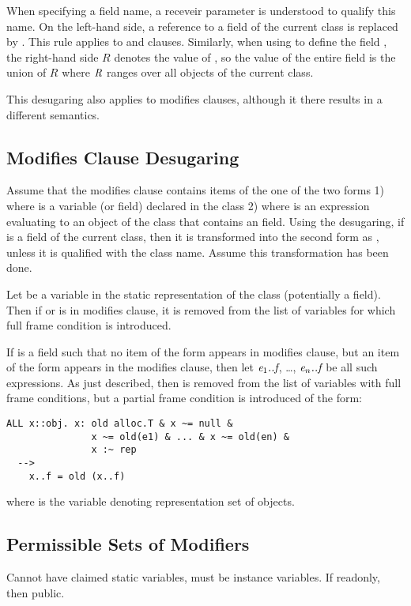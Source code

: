 When specifying a field name, a receveir parameter
 is understood to qualify this name.
On the left-hand side, a reference to a field  of the current
class  is replaced by .  This rule applies to  and
 clauses.  
Similarly, when using
 to define the field , the right-hand side $R$ denotes the
value of , so the value of the entire field is
the union of $R$ where $\textit{R}$ ranges over all objects of
the current class.

This desugaring also applies to modifies clauses, although
it there results in a different semantics.

\subsection{Modifies Clause Desugaring}

Assume that the modifies clause contains items of the one of the two
forms 1)  where  is a variable (or field) declared
in the class 2)  where  is an expression
evaluating to an object of the class that contains an 
field.  Using the desugaring, if  is a field of the current
class, then it is transformed into the second form as ,
unless it is qualified with the class name.  Assume this transformation
has been done.

Let  be a variable in the static representation of the
class (potentially a field).  Then if  or  is
in modifies clause, it is removed from the list of variables
for which full frame condition is introduced.

If  is a field such that no item of the form  appears
in modifies clause, but an item of the form  appears
in the modifies clause, then let $\textit{e}_1\textit{..f}$,
\ldots, $\textit{e}_n\textit{..f}$ be all such expressions.  As just described,
then  is removed from the list of variables with full
frame conditions, but a partial frame condition is introduced of
the form:
\begin{verbatim}
ALL x::obj. x: old alloc.T & x ~= null & 
               x ~= old(e1) & ... & x ~= old(en) &
               x :~ rep
  -->  
    x..f = old (x..f)
\end{verbatim}
where  is the variable denoting representation set of objects.

\subsection{Permissible Sets of Modifiers}
Cannot have claimed static variables, must be instance variables.  
If readonly, then public.

